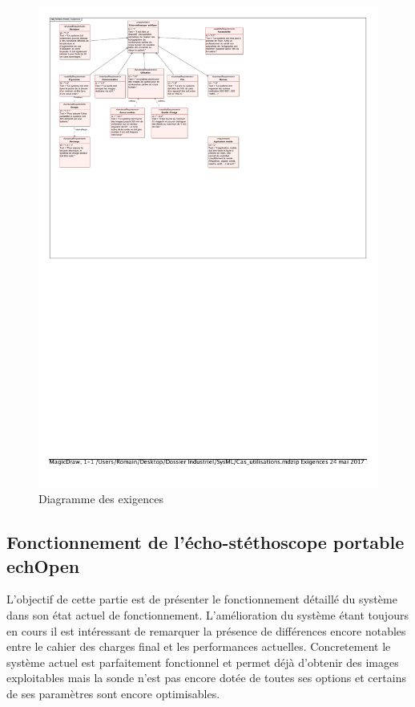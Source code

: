 \documentclass[12pt]{article}
\begin{document}
\begin{figure}[!h]
  \hspace{-25pt}
  \includegraphics[width=18cm,trim=1cm 18cm 8cm .75cm, clip=true]{Images_Rapport/cdc_pdf}
 
  
  \caption{Diagramme des exigences}
  
\end{figure}

\newpage

\subsection{Fonctionnement de l'écho-stéthoscope portable echOpen}

L'objectif de cette partie est de présenter le fonctionnement détaillé du système dans son état actuel de fonctionnement. L'amélioration du système étant toujours en cours il est intéressant de remarquer la présence de différences encore notables entre le cahier des charges final et les performances actuelles. Concretement le système actuel est parfaitement fonctionnel et permet déjà d'obtenir des images exploitables mais la sonde n'est pas encore dotée de toutes ses options et certains de ses paramètres sont encore optimisables.\par
\vspace{10pt}
\end{document}
